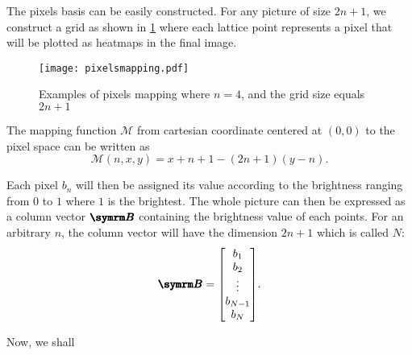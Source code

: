 The pixels basis can be easily constructed. For any picture of size $2n + 1$, we construct a grid as shown in \cref{fig:pixelsgrid} where each lattice point represents a pixel that will be plotted as heatmaps in the final image.
\begin{figure}
    \centering
    \texttt{[image: pixelsmapping.pdf]}
    \caption{Examples of pixels mapping where $n = 4$, and the grid size equals $2n + 1$}
    \label{fig:pixelsgrid}
\end{figure}

The mapping function $\mathcal{M}$ from cartesian coordinate centered at $(0, 0)$ to the pixel space can be written as
\begin{equation}
    \mathcal{M}(n, x, y) = x + n + 1 - (2n + 1)(y - n).
\end{equation}

Each pixel $b_n$ will then be assigned its value according to the brightness ranging from $0$ to $1$ where $1$ is the brightest. The whole picture can then be expressed as a column vector $\vv{B}$ containing the brightness value of each points. For an arbitrary $n$, the column vector will have the dimension $2n + 1$ which is called $N$:
\begin{equation}
    \vv{B} = \mqty[b_1 \\ b_2 \\ \vdots \\ b_{N - 1} \\ b_{N}].
\end{equation}

Now, we shall 